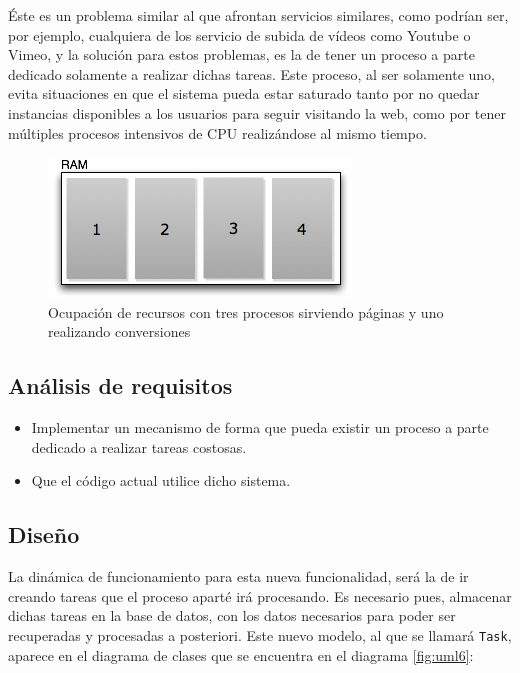 Éste es un problema similar al que afrontan servicios similares, como podrían ser, por ejemplo, cualquiera de los servicio de subida de vídeos como Youtube o Vimeo, y la solución para estos problemas, es la de tener un proceso a parte dedicado solamente a realizar dichas tareas. Este proceso, al ser solamente uno, evita situaciones en que el sistema pueda estar saturado tanto por no quedar instancias disponibles a los usuarios para seguir visitando la web, como por tener múltiples procesos intensivos de CPU realizándose al mismo tiempo.

\begin{figure}[h!]
\centering
\includegraphics{ram2.jpg}
\caption{Ocupación de recursos con tres procesos sirviendo páginas y uno realizando conversiones}\label{fig:ram2}
\end{figure}

\subsection{Análisis de requisitos} %
\label{sub:análisis_de_requisitos}

\begin{itemize}
  \item Implementar un mecanismo de forma que pueda existir un proceso a parte dedicado a realizar tareas costosas.
  \item Que el código actual utilice dicho sistema.
\end{itemize}


\subsection{Diseño} %
\label{sub:diseño}

La dinámica de funcionamiento para esta nueva funcionalidad, será la de ir creando tareas que el proceso aparté irá procesando. Es necesario pues, almacenar dichas tareas en la base de datos, con los datos necesarios para poder ser recuperadas y procesadas a posteriori. Este nuevo modelo, al que se llamará \texttt{Task}, aparece en el diagrama de clases que se encuentra en el diagrama \ref{fig:uml6}:

